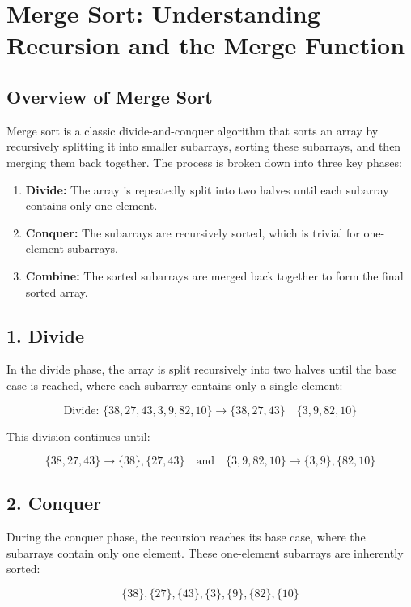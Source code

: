 \documentclass{article}
\begin{document}
\section*{Merge Sort: Understanding Recursion and the Merge Function}

\subsection*{Overview of Merge Sort}
Merge sort is a classic divide-and-conquer algorithm that sorts an array by recursively splitting it into smaller subarrays, sorting these subarrays, and then merging them back together. The process is broken down into three key phases:

\begin{enumerate}
    \item \textbf{Divide:} The array is repeatedly split into two halves until each subarray contains only one element.
    \item \textbf{Conquer:} The subarrays are recursively sorted, which is trivial for one-element subarrays.
    \item \textbf{Combine:} The sorted subarrays are merged back together to form the final sorted array.
\end{enumerate}

\subsection*{1. Divide}
In the divide phase, the array is split recursively into two halves until the base case is reached, where each subarray contains only a single element:

\[
\text{Divide: } \{38, 27, 43, 3, 9, 82, 10\} \rightarrow \{38, 27, 43\} \quad \{3, 9, 82, 10\}
\]

This division continues until:

\[
\{38, 27, 43\} \rightarrow \{38\}, \{27, 43\} \quad \text{and} \quad \{3, 9, 82, 10\} \rightarrow \{3, 9\}, \{82, 10\}
\]

\subsection*{2. Conquer}
During the conquer phase, the recursion reaches its base case, where the subarrays contain only one element. These one-element subarrays are inherently sorted:

\[
\{38\}, \{27\}, \{43\}, \{3\}, \{9\}, \{82\}, \{10\}
\]
\end{document}
